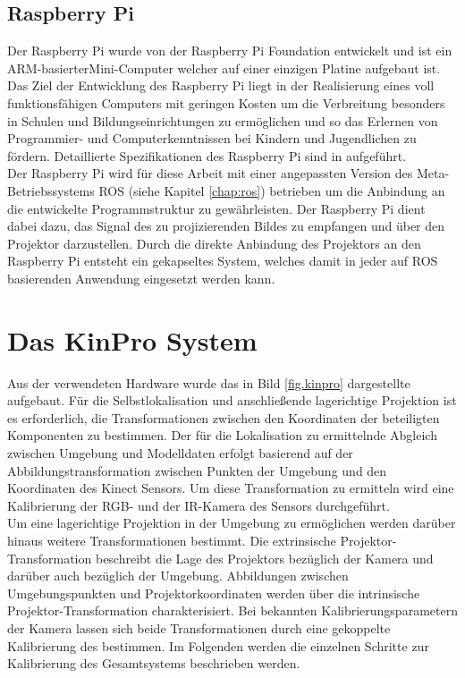 
\subsection{Raspberry Pi}
Der Raspberry Pi wurde von der Raspberry Pi Foundation  entwickelt und ist ein ARM-basierter\red[fußnote?] Mini-Computer welcher auf einer einzigen Platine aufgebaut ist. Das Ziel der Entwicklung des Raspberry Pi liegt in der Realisierung eines voll funktionsfähigen Computers mit geringen Kosten um die Verbreitung besonders in Schulen und Bildungseinrichtungen zu ermöglichen und so das Erlernen von Programmier- und Computerkenntnissen bei Kindern und Jugendlichen zu fördern. Detaillierte Spezifikationen des Raspberry Pi sind in  aufgeführt.\\

Der Raspberry Pi wird für diese Arbeit mit einer angepassten Version des Meta-Betriebssystems ROS (siehe Kapitel \ref{chap:ros}) betrieben um die Anbindung an die entwickelte Programmstruktur zu gewährleisten. Der Raspberry Pi dient dabei dazu, das Signal des zu projizierenden Bildes zu empfangen und über den Projektor darzustellen. Durch die direkte Anbindung des Projektors an den Raspberry Pi entsteht ein gekapseltes System, welches damit in jeder auf ROS basierenden Anwendung eingesetzt werden kann.

\section{Das KinPro System}
Aus der verwendeten Hardware wurde das in Bild \ref{fig.kinpro} dargestellte \kps{} aufgebaut. Für die Selbstlokalisation und anschließende lagerichtige Projektion ist es erforderlich, die Transformationen zwischen den Koordinaten der beteiligten Komponenten zu bestimmen. Der für die Lokalisation zu ermittelnde Abgleich zwischen Umgebung und Modelldaten erfolgt basierend auf der Abbildungstransformation zwischen Punkten der Umgebung und den Koordinaten des Kinect Sensors. Um diese Transformation zu ermitteln wird eine Kalibrierung der RGB- und der IR-Kamera des Sensors durchgeführt.\\

Um eine lagerichtige Projektion in der Umgebung zu ermöglichen werden darüber hinaus weitere Transformationen bestimmt. Die extrinsische Projektor-Transformation beschreibt die Lage des Projektors bezüglich der Kamera und darüber auch bezüglich der Umgebung. Abbildungen zwischen Umgebungspunkten und Projektorkoordinaten werden über die intrinsische Projektor-Transformation charakterisiert. Bei bekannten Kalibrierungsparametern der Kamera lassen sich beide Transformationen durch eine gekoppelte Kalibrierung des  bestimmen. Im Folgenden werden die einzelnen Schritte zur Kalibrierung des Gesamtsystems beschrieben werden.

